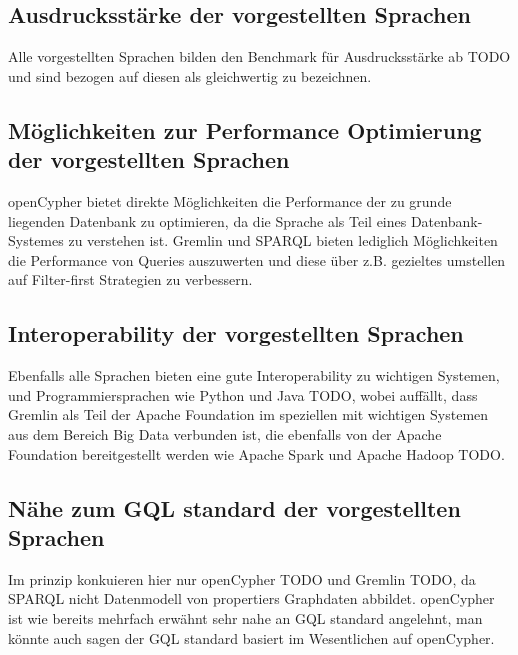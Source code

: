 \subsection{Ausdrucksstärke der vorgestellten Sprachen}
Alle vorgestellten Sprachen bilden den Benchmark für Ausdrucksstärke ab TODO 
und sind bezogen auf diesen als gleichwertig zu bezeichnen.
\subsection*{Möglichkeiten zur Performance Optimierung der vorgestellten Sprachen}
openCypher bietet direkte Möglichkeiten die Performance der zu grunde liegenden Datenbank 
zu optimieren, da die Sprache als Teil eines Datenbank-Systemes zu verstehen ist.
Gremlin und SPARQL bieten lediglich Möglichkeiten die Performance von Queries auszuwerten und 
diese über z.B. gezieltes umstellen auf Filter-first Strategien zu verbessern.
\subsection{Interoperability der vorgestellten Sprachen}
Ebenfalls alle Sprachen bieten eine gute Interoperability zu wichtigen Systemen,
und Programmiersprachen wie Python und Java TODO, 
wobei auffällt, dass Gremlin als Teil der Apache Foundation im speziellen mit wichtigen
Systemen aus dem Bereich Big Data verbunden ist, die ebenfalls von der Apache Foundation
bereitgestellt werden wie Apache Spark und Apache Hadoop TODO.
\subsection{Nähe zum GQL standard der vorgestellten Sprachen}
Im prinzip konkuieren hier nur openCypher TODO und Gremlin TODO, da SPARQL nicht 
Datenmodell von propertiers Graphdaten abbildet. openCypher ist wie bereits mehrfach 
erwähnt sehr nahe an GQL standard angelehnt, man könnte auch sagen der GQL 
standard basiert im Wesentlichen auf openCypher.

